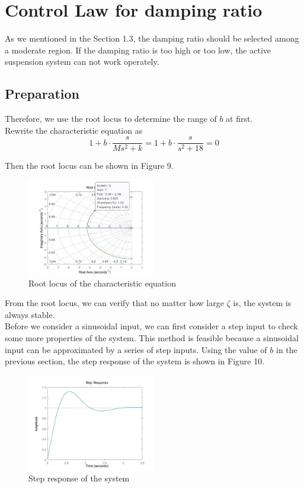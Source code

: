 \documentclass{article}
\begin{document}
\section{Control Law for damping ratio}
As we mentioned in the Section 1.3,
the damping ratio should be selected among a moderate region.
If the damping ratio is too high or too low, 
the active suspension system can not work operately.\\

\subsection{Preparation}

Therefore, we use the root locus to determine the range of $b$ at first.\\
Rewrite the characteristic equation as 
\begin{equation*}
    1+b\cdot \frac{s}{Ms^2+k}=1+b\cdot \frac{s}{s^2+18}=0
\end{equation*}

Then the root locus can be shown in Figure 9.\\

\begin{figure}[htbp]
    \centering
    \includegraphics[width=0.5\textwidth]{9.jpg}
    \caption{Root locus of the characteristic equation}
\end{figure}

From the root locus,
we can verify that no matter how large $\zeta$ is,
the system is always stable.\\

Before we consider a sinusoidal input,
we can first consider a step input to check some more properties of the system.
This method is feasible because a sinusoidal input can be approximated by a series of step inputs.
Using the value of $b$ in the previous section, the step response of the system is shown in Figure 10.\\

\begin{figure}[htbp]
    \centering
    \includegraphics[width=0.5\textwidth]{10.jpg}
    \caption{Step response of the system}
\end{figure}
\end{document}
